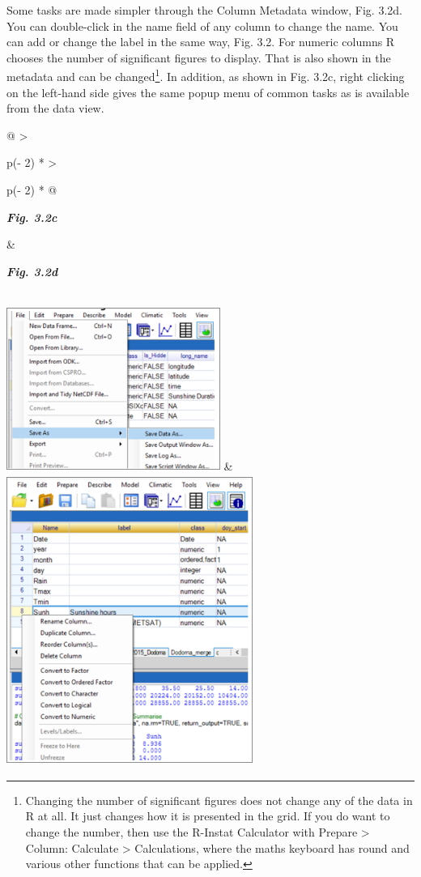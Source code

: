 \documentclass[
  letterpaper,
  DIV=11,
  numbers=noendperiod]{scrreprt}
\begin{document}
Some tasks are made simpler through the Column Metadata window, Fig.
3.2d. You can double-click in the name field of any column to change the
name. You can add or change the label in the same way, Fig. 3.2. For
numeric columns R chooses the number of significant figures to display.
That is also shown in the metadata and can be changed\footnote{Changing
  the number of significant figures does not change any of the data in R
  at all. It just changes how it is presented in the grid. If you do
  want to change the number, then use the R-Instat Calculator with
  Prepare \textgreater{} Column: Calculate \textgreater{} Calculations,
  where the maths keyboard has round and various other functions that
  can be applied.}. In addition, as shown in Fig. 3.2c, right clicking
on the left-hand side gives the same popup menu of common tasks as is
available from the data view.

\begin{longtable}[]{@{}
  >{\raggedright\arraybackslash}p{(\columnwidth - 2\tabcolsep) * }
  >{\raggedright\arraybackslash}p{(\columnwidth - 2\tabcolsep) * }@{}}
\toprule\noalign{}
\begin{minipage}[b]{\linewidth}\raggedright
\textbf{\emph{Fig. 3.2c}}
\end{minipage} & \begin{minipage}[b]{\linewidth}\raggedright
\textbf{\emph{Fig. 3.2d}}
\end{minipage} \\
\midrule\noalign{}
\endhead
\bottomrule\noalign{}
\endlastfoot
\includegraphics[width=2.74799in,height=2.10738in]{figures/Fig3.2c.png}
&
\includegraphics[width=3.16879in,height=3.74325in]{figures/Fig3.2d.png} \\
\end{longtable}
\end{document}
